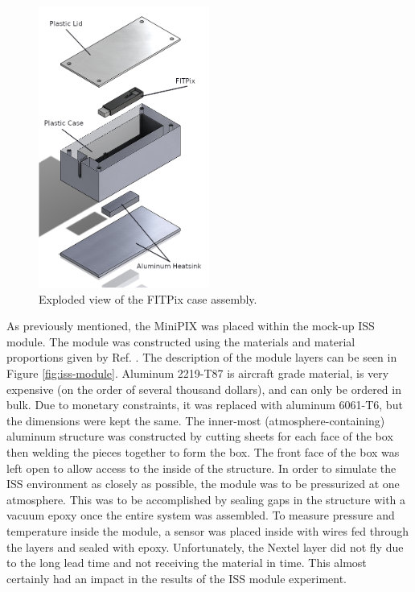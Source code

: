 \begin{figure}[h!]
	\begin{center}
		\includegraphics[width=0.5\textwidth]{figures/fitpix-case-exploded-labelled.png}
		\caption{Exploded view of the FITPix case assembly.}
		\label{fig:fitpix-container}
	\end{center}
\end{figure}

As previously mentioned, the MiniPIX was placed within the mock-up ISS module.
The module was constructed using the materials and material proportions given by Ref. \cite{NASA-ISS-Construction}.
The description of the module layers can be seen in Figure \ref{fig:iss-module}.
Aluminum 2219-T87 is aircraft grade material, is very expensive (on the order of several thousand dollars), and can only be ordered in bulk.
Due to monetary constraints, it was replaced with aluminum 6061-T6, but the dimensions were kept the same.
The inner-most (atmosphere-containing) aluminum structure was constructed by cutting sheets for each face of the box then welding the pieces together to form the box.
The front face of the box was left open to allow access to the inside of the structure.
In order to simulate the ISS environment as closely as possible, the module was to be pressurized at one atmosphere.
This was to be accomplished by sealing gaps in the structure with a vacuum epoxy once the entire system was assembled.
To measure pressure and temperature inside the module, a sensor was placed inside with wires fed through the layers and sealed with epoxy.
Unfortunately, the Nextel layer did not fly due to the long lead time and not receiving the material in time.
This almost certainly had an impact in the results of the ISS module experiment.

